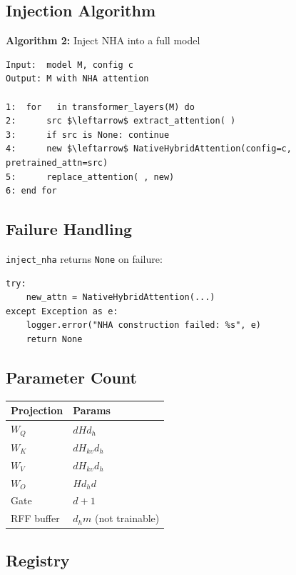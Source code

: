 \subsection{Injection Algorithm}

\textbf{Algorithm 2:} Inject NHA into a full model
\begin{lstlisting}
Input:  model M, config c
Output: M with NHA attention

1:  for   in transformer_layers(M) do
2:      src $\leftarrow$ extract_attention( )
3:      if src is None: continue
4:      new $\leftarrow$ NativeHybridAttention(config=c, pretrained_attn=src)
5:      replace_attention( , new)
6: end for
\end{lstlisting}

\subsection{Failure Handling}

\texttt{inject\_nha} returns \texttt{None} on failure:

\begin{lstlisting}
try:
    new_attn = NativeHybridAttention(...)
except Exception as e:
    logger.error("NHA construction failed: %s", e)
    return None
\end{lstlisting}

\subsection{Parameter Count}

\begin{table}[H]
\centering
\small
\begin{tabular}{ll}
\toprule
\textbf{Projection} & \textbf{Params} \\
\midrule
$W_Q$ & $d H d_h$ \\
$W_K$ & $d H_{kv} d_h$ \\
$W_V$ & $d H_{kv} d_h$ \\
$W_O$ & $H d_h d$ \\
Gate & $d + 1$ \\
RFF buffer & $d_h m$ (not trainable) \\
\bottomrule
\end{tabular}
\end{table}

\subsection{Registry}

